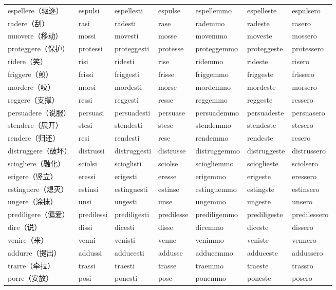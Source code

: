 \documentclass[UTF8,a4paper,titlepage,10pt]{report}
\begin{document}
\begin{enumerate}
\begin{itemize}
\begin{center}
\begin{tabular}{lllllll}
espellere（驱逐） & espulsi & espellesti & espulse & espellemmo & espelleste & espulsero\\
radere（刮） & rasi & radesti & rase & rademmo & radeste & rasero\\
muovere（移动） & mossi & movesti & mosse & movemmo & moveste & mossero\\
proteggere（保护） & protessi & proteggesti & protesse & proteggemmo & proteggeste & protessero\\
ridere（笑） & risi & ridesti & rise & ridemmo & rideste & risero\\
friggere（煎） & frissi & friggesti & frisse & friggemmo & friggeste & frissero\\
mordere（咬） & morsi & mordesti & morse & mordemmo & mordeste & morsero\\
reggere（支撑） & ressi & reggesti & resse & reggemmo & reggeste & ressero\\
persuadere（说服） & persuasi & persuadesti & persuase & persuademmo & persuadeste & persuasero\\
stendere（展开） & stesi & stendesti & stese & stendemmo & stendeste & stesero\\
rendere（归还） & resi & rendesti & rese & rendemmo & rendeste & resero\\
distruggere（破坏） & distrussi & distruggesti & distrusse & distruggemmo & distruggeste & distrussero\\
sciogliere（融化） & sciolsi & scioglisti & sciolse & sciogliemmo & scioglieste & sciolsero\\
erigere（竖立） & eressi & erigesti & eresse & erigemmo & erigeste & eressero\\
estinguere（熄灭） & estinsi & estinguesti & estinse & estinguemmo & estingste & estinsero\\
ungere（涂抹） & unsi & ungesti & unse & ungemmo & ungeste & unsero\\
prediligere（偏爱） & predilessi & prediligesti & predilesse & prediligemmo & prediligeste & predilessero\\
dire（说） & dissi & dicesti & disse & dicemmo & diceste & dissero\\
venire（来） & venni & venisti & venne & venimmo & veniste & vennero\\
addurre（提出） & addussi & adducesti & addusse & adducemmo & adduceste & addussero\\
trarre（牵拉） & trassi & traesti & trasse & traemmo & traeste & trassro\\
porre（安放） & posi & ponesti & pose & ponemmo & poneste & posero\\
\end{tabular}
\end{center}
\end{itemize}


\end{enumerate}
\end{document}

